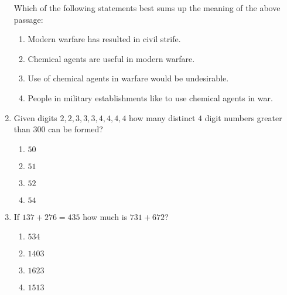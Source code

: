 \documentclass[journal]{IEEEtran}
\begin{document}
\begin{enumerate}
    Which of the following statements best sums up the meaning of the above passage:
    \begin{enumerate}
        \item Modern warfare has resulted in civil strife.
        \item Chemical agents are useful in modern warfare.
        \item Use of chemical agents in warfare would be undesirable.
        \item People in military establishments like to use chemical agents in war.
    \end{enumerate}
    \item Given digits $2, 2, 3, 3, 3, 4, 4, 4, 4$ how many distinct $4$ digit numbers greater than $300$ can be formed?
    \begin{enumerate}
        \item $50$
        \item $51$
        \item $52$
        \item $54$
    \end{enumerate}
    \item If $137 + 276 = 435$ how much is $731 + 672$? 
    \begin{enumerate}
        \item $534$
        \item $1403$
        \item $1623$
        \item $1513$
    \end{enumerate} 
\end{enumerate}
\end{document}
